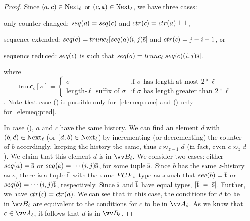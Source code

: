 \begin{proof}
  Since $(a,c) \in \mathrm{Next}_{\ell}$ or $(c,a) \in \mathrm{Next}_{\ell}$, we have three cases:
  \begin{romanenumerate}
    \item only counter changed: $\seq{a} = \seq{c}$ and $\ctr{c} = \ctr{a} \pm 1$,
    \item sequence extended: $\seq{c} = \mathsf{trunc}_{\ell}[\seq{a} (i,j) \elemtuples]$ and $\ctr{c} = j-i+1$, or
    \item sequence reduced: $\seq{c}$ is such that $\seq{a} = \mathsf{trunc}_{\ell}[\seq{c} (i,j) \elemtuples]$.
  \end{romanenumerate}
  where
  \begin{displaymath}
    \mathsf{trunc}_{\ell}[\sigma] =
    \begin{cases}
      \sigma & \text{if $\sigma$ has length at most $2 * \ell$} \\
      \text{length-$\ell$ suffix of $\sigma$} & \text{if $\sigma$ has length greater than $2 * \ell$}
    \end{cases}
  \end{displaymath}.
  Note that case () is possible only for~\ref{elemeq:succ} and () only for~\ref{elemeq:pred}.

  In case (), $a$ and $c$ have the same history.
  We can find an element $d$ with $(b,d) \in \mathrm{Next}_{\ell}$ (or $(d,b) \in \mathrm{Next}_{\ell}$) by incrementing (or decrementing) the counter of $b$ accordingly, keeping the history the same, thus $c \approx_{z-1} d$ (in fact, even $c \approx_{z} d$).
  We claim that this element $d$ is in $\unraveldom{B}_{\ell}$.
  We consider two cases: either $\seq{a} = \elemtuples$ or $\seq{a} = \cdots (i,j) \elemtuples$, for some tuple $\overline{\mathrm{s}}$.
  Since $b$ has the same $z$-history as $a$, there is a tuple $\overline{\mathrm{t}}$ with the same $\FGF_{z}$-type as $s$ such that $\seq{b} = \elemtuplet$ or $\seq{b} = \cdots (i,j) \elemtuplet$, respectively.
  Since $\overline{\mathrm{s}}$ and $\overline{\mathrm{t}}$ have equal types, $|\overline{\mathrm{t}}| = |\overline{\mathrm{s}}|$.
  Further, we have $\ctr{c} = \ctr{d}$.
  We can see that in this case, the conditions for $d$ to be in $\unraveldom{B}_{\ell}$ are equivalent to the conditions for $c$ to be in $\unraveldom{A}_{\ell}$.
  As we know that $c \in \unraveldom{A}_{\ell}$, it follows that $d$ is in $\unraveldom{B}_{\ell}$.


\end{proof}

